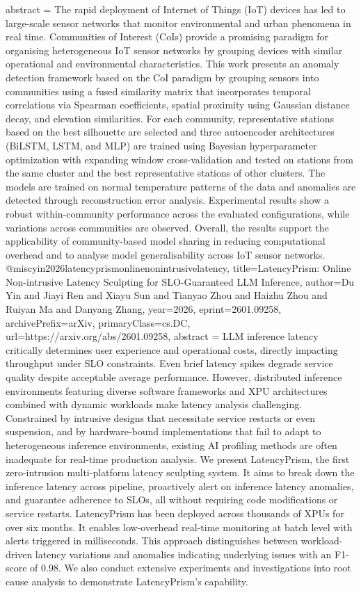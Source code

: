 {      abstract = {The rapid deployment of Internet of Things (IoT) devices has led to large-scale sensor networks that monitor environmental and urban phenomena in real time. Communities of Interest (CoIs) provide a promising paradigm for organising heterogeneous IoT sensor networks by grouping devices with similar operational and environmental characteristics. This work presents an anomaly detection framework based on the CoI paradigm by grouping sensors into communities using a fused similarity matrix that incorporates temporal correlations via Spearman coefficients, spatial proximity using Gaussian distance decay, and elevation similarities. For each community, representative stations based on the best silhouette are selected and three autoencoder architectures (BiLSTM, LSTM, and MLP) are trained using Bayesian hyperparameter optimization with expanding window cross-validation and tested on stations from the same cluster and the best representative stations of other clusters. The models are trained on normal temperature patterns of the data and anomalies are detected through reconstruction error analysis. Experimental results show a robust within-community performance across the evaluated configurations, while variations across communities are observed. Overall, the results support the applicability of community-based model sharing in reducing computational overhead and to analyse model generalisability across IoT sensor networks.}
}@misc{yin2026latencyprismonlinenonintrusivelatency,
      title={LatencyPrism: Online Non-intrusive Latency Sculpting for SLO-Guaranteed LLM Inference}, 
      author={Du Yin and Jiayi Ren and Xiayu Sun and Tianyao Zhou and Haizhu Zhou and Ruiyan Ma and Danyang Zhang},
      year={2026},
      eprint={2601.09258},
      archivePrefix={arXiv},
      primaryClass={cs.DC},
      url={https://arxiv.org/abs/2601.09258},
      abstract = {LLM inference latency critically determines user experience and operational costs, directly impacting throughput under SLO constraints. Even brief latency spikes degrade service quality despite acceptable average performance. However, distributed inference environments featuring diverse software frameworks and XPU architectures combined with dynamic workloads make latency analysis challenging. Constrained by intrusive designs that necessitate service restarts or even suspension, and by hardware-bound implementations that fail to adapt to heterogeneous inference environments, existing AI profiling methods are often inadequate for real-time production analysis.   We present LatencyPrism, the first zero-intrusion multi-platform latency sculpting system. It aims to break down the inference latency across pipeline, proactively alert on inference latency anomalies, and guarantee adherence to SLOs, all without requiring code modifications or service restarts. LatencyPrism has been deployed across thousands of XPUs for over six months. It enables low-overhead real-time monitoring at batch level with alerts triggered in milliseconds. This approach distinguishes between workload-driven latency variations and anomalies indicating underlying issues with an F1-score of 0.98. We also conduct extensive experiments and investigations into root cause analysis to demonstrate LatencyPrism's capability.}
}
